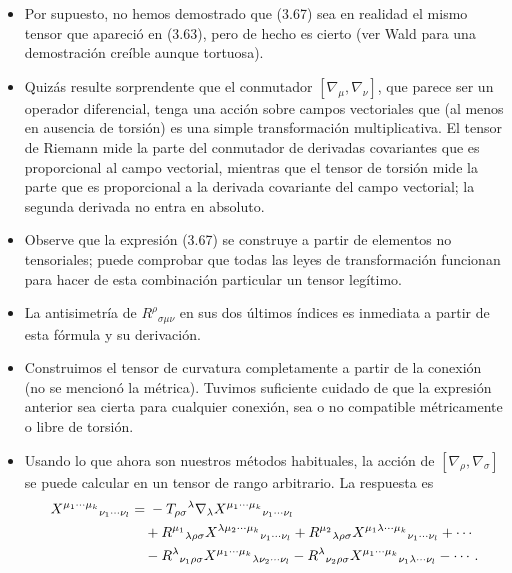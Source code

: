\documentclass[11pt,b5paper,openany,twoside]{book}
\newcommand{\mn}{{\mu\nu}}
\begin{document}
\begin{itemize}
\item Por supuesto, no hemos demostrado que (3.67) sea en realidad el mismo tensor que apareció en (3.63), pero de hecho es cierto (ver Wald para una demostración creíble aunque tortuosa).
\item Quizás resulte sorprendente que el conmutador $[\nabla_\mu,\nabla_\nu]$, que parece ser un operador diferencial, tenga una acción sobre campos vectoriales que (al menos en ausencia de torsión) es una simple transformación multiplicativa.
El tensor de Riemann mide la parte del conmutador de derivadas covariantes que es proporcional al campo vectorial, mientras que el tensor de torsión mide la parte que es proporcional a la derivada covariante del campo vectorial; la segunda derivada no entra en absoluto.
\item Observe que la expresión (3.67) se construye a partir de elementos no tensoriales; puede comprobar que todas las leyes de transformación funcionan para hacer de esta combinación particular un tensor legítimo.
\item La antisimetría de $R^\rho{}_{\sigma\mn}$ en sus dos últimos índices es inmediata a partir de esta fórmula y su derivación.
\item Construimos el tensor de curvatura completamente a partir de la conexión (no se mencionó la métrica).
Tuvimos suficiente cuidado de que la expresión anterior sea cierta para cualquier conexión, sea o no compatible métricamente o libre de torsión.
\item Usando lo que ahora son nuestros métodos habituales, la acción de $[\nabla_\rho,\nabla_\sigma]$ se puede calcular en un tensor de rango arbitrario.
La respuesta es
\begin{align}
[\nabla_\rho,\nabla_\sigma]X^{\mu_1\cdots
\mu_k}{}_{\nu_1\cdots\nu_l} &=
{} -T_{\rho\sigma}{}^\lambda\nabla_\lambda
X^{\mu_1\cdots \mu_k}{}_{\nu_1\cdots\nu_l}  \notag \\
&\quad +R^{\mu_1}{}_{\lambda\rho\sigma} X^{\lambda \mu_2\cdots \mu_k}{}_{\nu_1
\cdots \nu_l}+R^{\mu_2}{}_{\lambda\rho\sigma} X^{\mu_1\lambda\cdots
\mu_k}{}_{\nu_1 \cdots \nu_l} +\cdots  \notag \\
&\quad -R^{\lambda}{}_{\nu_1\rho\sigma} X^{\mu_1\cdots \mu_k}{}_{\lambda\nu_2
\cdots \nu_l} - R^{\lambda}{}_{\nu_2\rho\sigma} X^{\mu_1\cdots
\mu_k}{}_{\nu_1\lambda\cdots \nu_l} - \cdots \,. \label{3.68}
\end{align}
\end{itemize}
\end{document}

